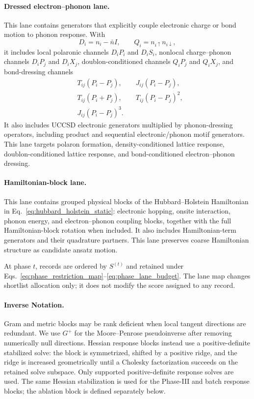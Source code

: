 \documentclass[
  reprint,
  amsmath,
  amssymb,
  aps,
  pra,
  nofootinbib,
  superscriptaddress,
  floatfix
]{revtex4-2}
\begin{document}
\paragraph*{Dressed electron--phonon lane.}
This lane contains generators that explicitly couple electronic charge or bond
motion to phonon response. With
\[
D_i=n_i-\bar n I,
\qquad
Q_i=n_{i\uparrow}n_{i\downarrow},
\]
it includes local polaronic channels \(D_iP_i\) and \(D_iS_i\), nonlocal
charge--phonon channels \(D_iP_j\) and \(D_iX_j\), doublon-conditioned channels
\(Q_iP_j\) and \(Q_iX_j\), and bond-dressing channels
\begin{align*}
&T_{ij}(P_i-P_j),
\qquad
J_{ij}(P_i-P_j),\\
&T_{ij}(P_i+P_j),
\qquad
T_{ij}(P_i-P_j)^2,\\
&J_{ij}(P_i-P_j)^3 .
\end{align*}
It also includes UCCSD electronic generators multiplied by phonon-dressing
operators, including product and sequential electronic/phonon motif generators.
This lane targets polaron formation, density-conditioned lattice response,
doublon-conditioned lattice response, and bond-conditioned electron--phonon
dressing.

\paragraph*{Hamiltonian-block lane.}
This lane contains grouped physical blocks of the Hubbard--Holstein Hamiltonian
in Eq.~\eqref{eq:hubbard_holstein_static}: electronic hopping, onsite
interaction, phonon energy, and electron--phonon coupling blocks, together with
the full Hamiltonian-block rotation when included. It also includes
Hamiltonian-term generators and their quadrature partners. This lane preserves
coarse Hamiltonian structure as candidate ansatz motion.

At phase \(t\), records are ordered by \(S^{(t)}\) and retained under
Eqs.~\eqref{eq:phase_restriction_map}--\eqref{eq:phase_lane_budget}. The lane
map changes shortlist allocation only; it does not modify the score assigned to
any record.

\paragraph*{Inverse Notation.}
Gram and metric blocks may be rank deficient when local tangent directions are
redundant. We use \(G^+\) for the Moore--Penrose pseudoinverse after removing
numerically null directions. Hessian response blocks instead use a
positive-definite stabilized solve: the block is symmetrized, shifted by a
positive ridge, and the ridge is increased geometrically until a Cholesky
factorization succeeds on the retained solve subspace. Only supported
positive-definite response solves are used. The same Hessian stabilization is
used for the Phase-III and batch response blocks; the ablation block is defined
separately below.
\end{document}
